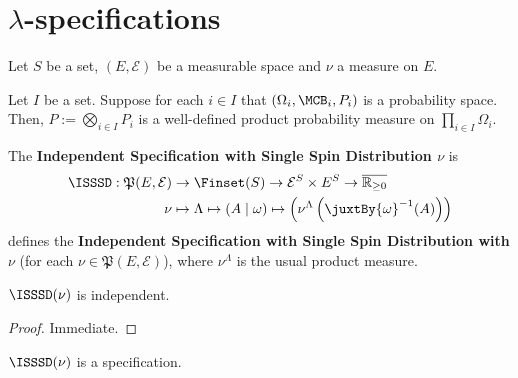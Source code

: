 \section{\texorpdfstring{$\lambda$}{Lambda}-specifications}

Let $S$ be a set, $(E, \mathcal{E})$ be a measurable space and $\nu$ a measure on $E$.

\begin{definition}
    \label{def:product-probability-measure}
    \leanok{}

    Let $I$ be a set. Suppose for each $i\in I$ that $(\Omega_i,\MCB_i,P_i)$ is a probability space. Then, $P:=\bigotimes_{i\in I}P_i$ is a well-defined product probability measure on $\prod_{i\in I}\Omega_i$.
\end{definition}

\begin{definition}
    \label{def:isssd}

    The \textbf{Independent Specification with Single Spin Distribution $\nu$} is
    \begin{align}
        \ISSSD:\mathfrak{P}(E, \mathcal{E})&\to\Finset(S)\to\mathcal{E}^S\times E^S\to\overline{\mathbb{R}_{\geq0}}\\
        \nu&\mapsto\Lambda\mapsto(A\mid\omega)\mapsto\left(\nu^\Lambda\left(\juxtBy{\omega}^{-1}(A)\right)\right)
    \end{align}
    defines the \textbf{Independent Specification with Single Spin Distribution with $\nu$} (for each $\nu\in\mathfrak{P}(E, \mathcal{E})$), where $\nu^\Lambda$ is the usual product measure.
\end{definition}

\begin{lemma}
    \label{lem:isssd-isIndep}
    \leanok{}

    $\ISSSD(\nu)$ is independent.
\end{lemma}
\begin{proof}

  Immediate.
\end{proof}


\begin{definition}
    \label{def:isssd-spec}
    \leanok

    $\ISSSD(\nu)$ is a specification.
\end{definition}


